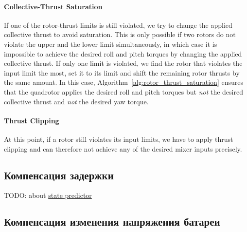 \documentclass[12pt,a4paper,fleqn]{article}
\begin{document}
\paragraph{Collective-Thrust Saturation}

If one of the rotor-thrust limits is still violated, we try to change the applied collective thrust to avoid saturation.
This is only possible if two rotors do not violate the upper and the lower limit simultaneously, in which case it is impossible to achieve the desired roll and pitch torques by changing the applied collective thrust.
If only one limit is violated, we find the rotor that violates the input limit the most, set it to its limit and shift the remaining rotor thrusts by the same amount.
In this case, Algorithm~\ref{alg:rotor_thrust_saturation} ensures that the quadrotor applies the desired roll and pitch torques but \emph{not} the desired collective thrust and \emph{not} the desired yaw torque.

\paragraph{Thrust Clipping}

At this point, if a rotor still violates its input limits, we have to apply thrust clipping and can therefore not achieve any of the desired mixer inputs precisely.

\subsection{Компенсация задержки}

TODO: about \href{https://github.com/uzh-rpg/rpg_quadrotor_common/tree/master/state_predictor}{state predictor}

\subsection{Компенсация изменения напряжения батареи} \label{sec:battery_voltage_compensation}
\end{document}

